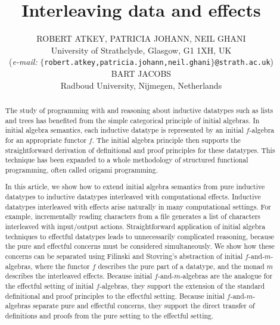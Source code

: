 \documentclass{jfp1}
\title{Interleaving data and effects}
\author[R. Atkey, P. Johann, N. Ghani, B. Jacobs]
       {ROBERT ATKEY, PATRICIA JOHANN, NEIL GHANI \\
         University of Strathclyde, Glasgow, G1 1XH, UK \\
         {\footnotesize (\emph{e-mail:} \texttt{$\{$robert.atkey,patricia.johann,neil.ghani$\}$@strath.ac.uk})} \\
         \vspace{0.3cm}
         BART JACOBS \\
         Radboud University, Nijmegen, Netherlands
         \email{bart@cs.ru.nl}}
\begin{document}
\label{firstpage}

\maketitle

\begin{abstract}
  The study of programming with and reasoning about inductive
  datatypes such as lists and trees has benefited from the simple
  categorical principle of initial algebras. In initial algebra
  semantics, each inductive datatype is represented by an initial
  $f$-algebra for an appropriate functor $f$. The initial algebra
  principle then supports the straightforward derivation of
  definitional and proof principles for these datatypes.  This
  technique has been expanded to a whole methodology of structured
  functional programming, often called origami programming.

  In this article, we show how to extend initial algebra semantics
  from pure inductive datatypes to inductive datatypes interleaved
  with computational effects. Inductive datatypes interleaved with
  effects arise naturally in many computational settings. For example,
  incrementally reading characters from a file generates a list of
  characters interleaved with input/output actions. Straightforward
  application of initial algebra techniques to effectful datatypes
  leads to unnecessarily complicated reasoning, because the pure and
  effectful concerns must be considered simultaneously. We show how
  these concerns can be separated using Filinski and St\o{}vring's
  abstraction of initial $f$-and-$m$-algebras, where the functor $f$
  describes the pure part of a datatype, and the monad $m$ describes
  the interleaved effects. Because initial $f$-and-$m$-algebras are
  the analogue for the effectful setting of initial $f$-algebras, they
  support the extension of the standard definitional and proof
  principles to the effectful setting. Because initial
  $f$-and-$m$-algebras separate pure and effectful concerns, they
  support the direct transfer of definitions and proofs from the pure
  setting to the effectful setting.




\end{abstract}
\end{document}
